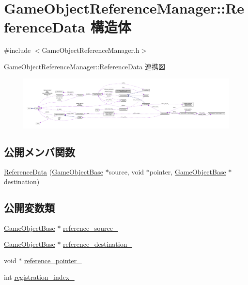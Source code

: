 \hypertarget{struct_game_object_reference_manager_1_1_reference_data}{}\section{Game\+Object\+Reference\+Manager\+:\+:Reference\+Data 構造体}
\label{struct_game_object_reference_manager_1_1_reference_data}


{\ttfamily \#include $<$Game\+Object\+Reference\+Manager.\+h$>$}



Game\+Object\+Reference\+Manager\+:\+:Reference\+Data 連携図\nopagebreak
\begin{figure}[H]
\begin{center}
\leavevmode
\includegraphics[width=350pt]{struct_game_object_reference_manager_1_1_reference_data__coll__graph}
\end{center}
\end{figure}
\subsection*{公開メンバ関数}
\begin{DoxyCompactItemize}
\item 
\mbox{\hyperlink{struct_game_object_reference_manager_1_1_reference_data_a3f1746e9c2998734776132c3734a69ae}{Reference\+Data}} (\mbox{\hyperlink{class_game_object_base}{Game\+Object\+Base}} $\ast$source, void $\ast$pointer, \mbox{\hyperlink{class_game_object_base}{Game\+Object\+Base}} $\ast$destination)
\end{DoxyCompactItemize}
\subsection*{公開変数類}
\begin{DoxyCompactItemize}
\item 
\mbox{\hyperlink{class_game_object_base}{Game\+Object\+Base}} $\ast$ \mbox{\hyperlink{struct_game_object_reference_manager_1_1_reference_data_a3a949f29b8484e8c9498a78e0c936ac4}{reference\+\_\+source\+\_\+}}
\item 
\mbox{\hyperlink{class_game_object_base}{Game\+Object\+Base}} $\ast$ \mbox{\hyperlink{struct_game_object_reference_manager_1_1_reference_data_af5d72ac9856b14efb3eee47d4c6db72a}{reference\+\_\+destination\+\_\+}}
\item 
void $\ast$ \mbox{\hyperlink{struct_game_object_reference_manager_1_1_reference_data_a360dfcbaa8421065a9d3b9d963ed576b}{reference\+\_\+pointer\+\_\+}}
\item 
int \mbox{\hyperlink{struct_game_object_reference_manager_1_1_reference_data_a36154b84fbcaa168786a74854cfda609}{registration\+\_\+index\+\_\+}}
\end{DoxyCompactItemize}


